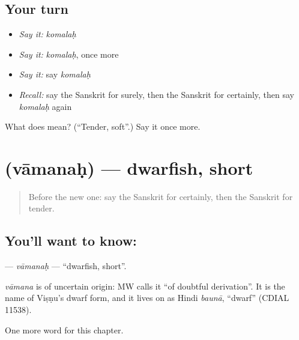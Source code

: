 \subsection*{Your turn}
\begin{itemize}
\raggedright
  \item \emph{Say it:} \emph{komalaḥ}
  \item \emph{Say it:} \emph{komalaḥ}, once more
  \item \emph{Say it:} say \emph{komalaḥ}
  \item \emph{Recall:} say the Sanskrit for surely, then the Sanskrit for certainly, then say \emph{komalaḥ} again
\end{itemize}

\begin{tcolorbox}[breakable,colback=teal!4,colframe=teal!35!black,title={Before you move on}]
What does  mean? (\textquotedblleft{}Tender, soft\textquotedblright{}.) Say it once more.
\end{tcolorbox}
\section[\texorpdfstring{\sk{वामनः} (vāmanaḥ)}{वामनः (vāmanaḥ)}]{ (vāmanaḥ) — dwarfish, short}

\label{lesson:SA-C186-vamanah}



\begin{quote}
Before the new one: say the Sanskrit for certainly, then the Sanskrit for tender.
\end{quote}

\subsection*{You'll want to know: }
\textbf{} — \emph{vāmanaḥ} — \textquotedblleft{}dwarfish, short\textquotedblright{}.

\begin{cousinweb}
\emph{vāmana} is of uncertain origin: MW calls it \textquotedblleft{}of doubtful derivation\textquotedblright{}. It is the name of Viṣṇu's dwarf form, and it lives on as Hindi \emph{baunā}, \textquotedblleft{}dwarf\textquotedblright{} (CDIAL 11538).
\end{cousinweb}

\begin{grammarlens}[title={What you've built}]
One more word for this chapter.
\end{grammarlens}

